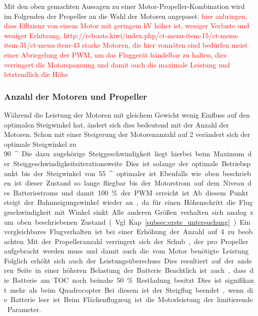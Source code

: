 Mit den oben gemachten Aussagen zu einer Motor-Propeller-Kombination wird im Folgenden der Propeller an die Wahl der Motoren angepasst.
\textcolor{red}{hier anbringen, dass Effizienz von einem Motor mit geringem kV höher ist, weniger Verluste und weniger Erhitzung, 
http://rcboats.kiwi/index.php/ct-menu-item-15/ct-menu-item-31/ct-menu-item-43}
\textcolor{red}{starke Motoren, die hier vonnöten sind bedürfen meist einer Abriegelung der PWM, um das Fluggerät händelbar zu halten, dies verringert die Motorspannung und damit auch die maximale Leistung und letztendlich die Höhe}


\subsubsection{Anzahl der Motoren und Propeller}
\label{subsubsec:anz_mot_flaechenflzg}
Während die Leistung der Motoren mit gleichem Gewicht wenig Einfluss auf den optimalen Steigwinkel hat, ändert sich dies bedeutend mit der Anzahl der Motoren. Schon mit einer Steigerung der Motorenanzahl auf 2 verändert sich der optimale Steigwinkel zu \SI{90}{^\circ}. Die dazu zugehörige Steiggeschwindigkeit liegt hierbei beim Maximum der Steiggeschwindigkeitsiterationsweite. Dies ist solange der optimale Betriebspunkt bis der Steigwinkel von \SI{55}{^\circ} optimaler ist.
Ebenfalls wie oben beschrieben ist dieser Zustand so lange fliegbar bis der Motorstrom auf dem Niveau des Batteriestroms und damit \SI{100}{\%} der PWM erreicht ist. Ab diesem Punkt steigt der Bahnneigungswinkel wieder an, da für einen Höhenschritt die Fluggeschwindigkeit mit Winkel sinkt. Alle anderen Größen verhalten sich analog zum oben beschriebenen Zustand (Vgl. Kap. \ref{subsec:erste_untersuchung}). Ein vergleichbares Flugverhalten ist bei einer Erhöhung der Anzahl auf 4 zu beobachten.
Mit der Propelleranzahl verringert sich der Schub, der pro Propeller aufgebracht werden muss und damit auch die vom Motor benötigte Leistung. Folglich erhöht sich auch der Leistungsüberschuss. Dies resultiert auf der anderen Seite in einer höheren Belastung der Batterie. Beachtlich ist auch, dass die Batterie am TOC noch beinahe \SI{50}{\%} Restladung besitzt. Dies ist signifikant mehr als beim Quadrocopter. Bei diesem ist der Steigflug beendet, wenn die Batterie leer ist. Beim Flächenflugzeug ist die Motorleistung der limitierende Parameter.

